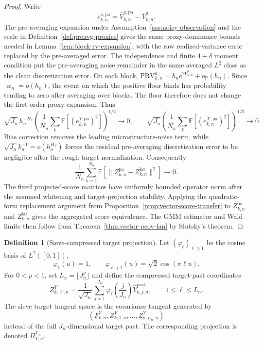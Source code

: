 \documentclass[11pt,a4paper]{amsart}
\theoremstyle{plain}
\theoremstyle{definition}
\newtheorem{definition}[theorem]{Definition}
\theoremstyle{remark}
\newcommand{\PP}{\mathbb{P}}
\newcommand{\EE}{\mathbb{E}}
\begin{document}
\begin{proof}
Write
\[
        e_{k,n}^{a,\mathrm{pa}}
        =
        \widehat V_{k,n}^{a,\mathrm{pa}}-\overline V_{k,n}^{a}.
\]
The pre-averaging expansion under Assumption~\ref{ass:noisy-observation} and the scale in
Definition~\ref{def:preavg-proxies} gives the same proxy-dominance bounds needed in
Lemma~\ref{lem:block-rv-expansion}, with the raw realized-variance error replaced by the
pre-averaged error.  The independence and finite \(4+\delta\) moment condition put the pre-averaging
noise remainder in the same averaged \(L^2\) class as the clean discretization error.  On each block,
\(\mathrm{PRV}_{k,n}^{a}=h_n e^{2\overline V_{k,n}^{a}}+o_{\PP}(h_n)\).  Since \(\varpi_n=o(h_n)\),
the event on which the positive floor binds has probability
tending to zero after averaging over blocks.  The floor therefore does not change the first-order
proxy expansion.  Thus
\[
        \sqrt{J_n}\,h_n^{-H_Y}
        \left(
        \frac1{N_n}\sum_k
        \EE[(e_{k,n}^{Y,\mathrm{pa}})^2]
        \right)^{1/2}
        \to0,
        \qquad
        \sqrt{J_n}
        \left(
        \frac1{N_n}\sum_k
        \EE[(e_{k,n}^{X,\mathrm{pa}})^2]
        \right)^{1/2}
        \to0.
\]
Bias correction removes the leading microstructure-noise term, while
\(\sqrt{J_n}k_n^{-1}=o(h_n^{H_Y})\) forces the residual pre-averaging discretization error to be
negligible after the rough target normalization.  Consequently
\[
        \frac1{N_n}\sum_{k=1}^{N_n}
        \EE
        \left[
        \|Z_{k,n}^{\mathrm{pa}}-Z_{k,n}^{\mathrm{lat}}\|^2
        \right]
        \to0.
\]
The fixed projected-score matrices have uniformly bounded operator norm after the assumed
whitening and target-projection stability.  Applying the quadratic-form replacement argument from
Proposition~\ref{prop:vector-score-transfer} to \(Z_{k,n}^{\mathrm{pa}}\) and
\(Z_{k,n}^{\mathrm{lat}}\) gives the aggregated score equivalence.  The GMM estimator and Wald
limits then follow from Theorem~\ref{thm:vector-pcov-lan} by Slutsky's theorem.
\end{proof}

\begin{definition}[Sieve-compressed target projection]\label{def:sieve-projection}
Let \((\varphi_\ell)_{\ell\ge1}\) be the cosine basis of \(L^2([0,1])\),
\[
        \varphi_1(u)=1,
        \qquad
        \varphi_{\ell+1}(u)=\sqrt2\cos(\pi\ell u).
\]
For \(0<\rho<1\), set \(L_n=\lfloor J_n^\rho\rfloor\) and define the compressed target-past
coordinates
\[
        Z_{k,\ell,n}^{Y}
        =
        \frac1{\sqrt{J_n}}
        \sum_{j=1}^{J_n}
        \varphi_\ell\!\left(\frac{j}{J_n}\right)
        \widehat Y_{k,j,n}^{\mathrm{past}},
        \qquad
        1\le\ell\le L_n.
\]
The sieve target tangent space is the covariance tangent generated by
\[
        (F_{k,n}^{Y},Z_{k,1,n}^{Y},\dots,Z_{k,L_n,n}^{Y})
\]
instead of the full \(J_n\)-dimensional target past.  The corresponding projection is denoted
\(\Pi_{Y,n}^{L_n}\).
\end{definition}
\end{document}
